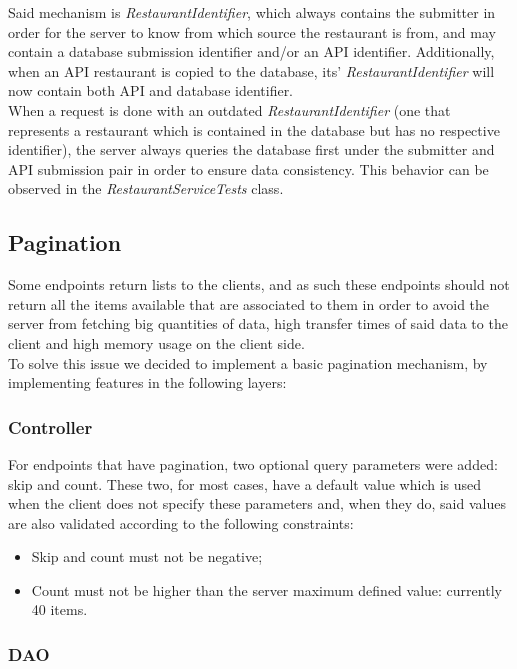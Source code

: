 Said mechanism is \textit{RestaurantIdentifier}, which always contains the submitter in order for the server to know from which source the restaurant
is from, and may contain a database submission identifier and/or an API identifier. Additionally, when an API restaurant is copied to the database,
its' \textit{RestaurantIdentifier} will now contain both API and database identifier.\\

When a request is done with an outdated \textit{RestaurantIdentifier} (one that represents a restaurant which is contained in the database but has no respective
identifier), the server always queries the database first under the submitter and API submission pair in order to ensure data consistency. This behavior
can be observed in the \textit{RestaurantServiceTests} class.

\subsection{Pagination}

Some endpoints return lists to the clients, and as such these endpoints should not return all the items available that are associated
to them in order to avoid the server from fetching big quantities of data, high transfer times of said data to the client and 
high memory usage on the client side.\\

To solve this issue we decided to implement a basic pagination mechanism, by implementing features in the following layers:\\

\subsubsection{Controller}

For endpoints that have pagination, two optional query parameters were added: skip and count. These two, for most cases, have a
default value which is used when the client does not specify these parameters and, when they do, said values are also validated 
according to the following constraints:
\begin{itemize}
    \item Skip and count must not be negative;
    \item Count must not be higher than the server maximum defined value: currently 40 items.
\end{itemize}

\subsubsection{DAO}

